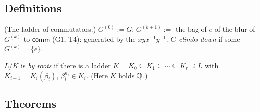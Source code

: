 \subsection*{Definitions}

\begin{lines}
\item[\lab{D1}] (The ladder of commutators.) $G^{(0)} := G$; $G^{(k+1)} :=$ the bag of $e$ of the blur of $G^{(k)}$ to $\mathsf{comm}$ (G1, T4): generated by the $xyx^{-1}y^{-1}$. $G$ \emph{climbs down} if some $G^{(k)} = \{e\}$.
\item[\lab{D2}] $L/K$ is \emph{by roots} if there is a ladder $K = K_0 \subseteq K_1 \subseteq \cdots \subseteq K_r \supseteq L$ with $K_{i+1} = K_i(\beta_i)$, $\beta_i^{n_i} \in K_i$. (Here $K$ holds $\mathbb{Q}$.)
\end{lines}

\subsection*{Theorems}

